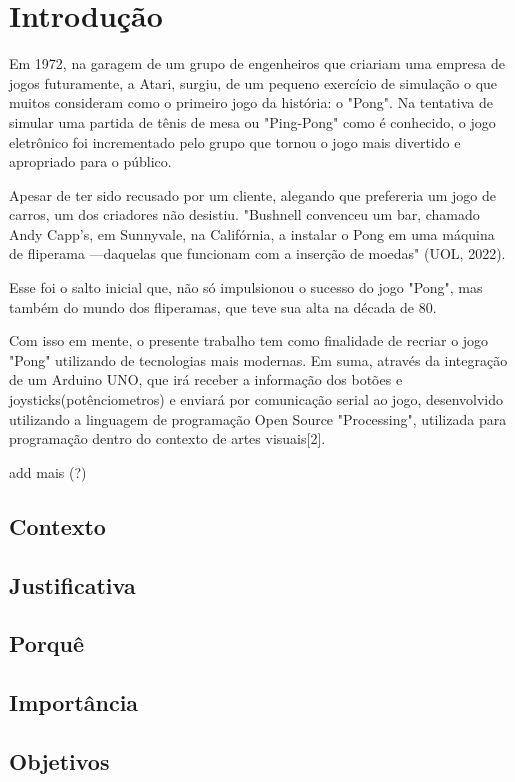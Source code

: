 \documentclass[conference]{IEEEtran}
\begin{document}
\section{Introdução}
	Em 1972, na garagem de um grupo de engenheiros que criariam uma empresa de jogos futuramente, a Atari, surgiu, de um pequeno exercício de simulação o que muitos consideram como o primeiro jogo da história: o "Pong". Na tentativa de simular uma partida de tênis de mesa ou "Ping-Pong" como é conhecido, o jogo eletrônico foi incrementado pelo grupo que tornou o jogo mais divertido e apropriado para o público.

	Apesar de ter sido recusado por um cliente, alegando que prefereria um jogo de carros, um dos criadores não desistiu. "Bushnell convenceu um bar, chamado Andy Capp's, em Sunnyvale, na Califórnia, a instalar o Pong em uma máquina de fliperama —daquelas que funcionam com a inserção de moedas" (UOL, 2022). 

	Esse foi o salto inicial que, não só impulsionou o sucesso do jogo "Pong", mas também do mundo dos fliperamas, que teve sua alta na década de 80.

	Com isso em mente, o presente trabalho tem como finalidade de recriar o jogo "Pong" utilizando de tecnologias mais modernas. Em suma, através da integração de um Arduino UNO, que irá receber a informação dos botões e joysticks(potênciometros) e enviará por comunicação serial ao jogo, desenvolvido utilizando a linguagem de programação Open Source "Processing", utilizada para programação dentro do contexto de artes visuais[2].

add mais (?)


\subsection{Contexto}

\subsection{Justificativa}

\subsection{Porquê}

\subsection{Importância}

\subsection{Objetivos}
\end{document}
